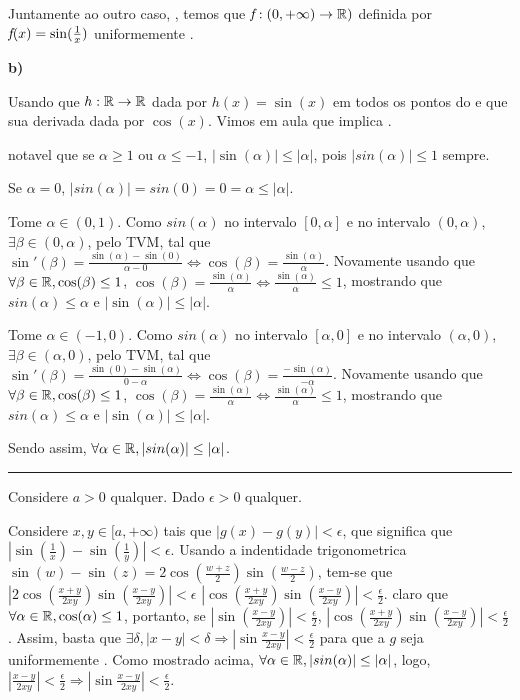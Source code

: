 Juntamente ao outro caso, \entao, temos que $\mkern-2mu f\mkern-3mu :(0,+\infty)\rightarrow\mathbb{R})$ definida por \mbox{$\mkern-2mu f\mkern-3mu (x) = \sin (\frac{1}{x})$} \nao \eh uniformemente \continua.

\textbf{b)}

Usando que $h:\mathbb{R}\rightarrow\mathbb{R}$ dada por $h(x) = \sin(x)$ \eh \diferenciavel em todos os pontos do \dominio e que sua derivada \eh dada por $\cos(x)$. Vimos em aula que \diferenciavel implica \continua.

\Eh notavel que se $\alpha\ge 1$ ou $\alpha \le -1$, \entao $|\sin(\alpha)| \le |\alpha|$, pois $|sin(\alpha)| \le 1$ sempre.

Se $\alpha = 0$, $|sin(\alpha)| = sin(0) = 0 = \alpha \le |\alpha|$.

Tome \entao $\alpha \in (0,1)$. Como $sin(\alpha)$ \eh \continua no intervalo $[0,\alpha]$ e \diferenciavel no intervalo $(0,\alpha)$, \entao $\exists \beta \in (0, \alpha)$, pelo TVM, tal que \mbox{$\sin'(\beta) = \frac{\sin(\alpha) - \sin(0)}{\alpha - 0} \iff \cos(\beta) = \frac{\sin(\alpha)}{\alpha}$}. Novamente usando que $\forall \beta \in \mathbb{R}, \cos(\beta) \leq 1$, $\cos(\beta) = \frac{\sin(\alpha)}{\alpha} \iff  \frac{\sin(\alpha)}{\alpha} \le 1$, mostrando que $sin(\alpha) \le \alpha$ e $|\sin(\alpha)| \le |\alpha|$.

Tome \entao $\alpha \in (-1,0)$. Como $sin(\alpha)$ \eh \continua no intervalo $[\alpha,0]$ e \diferenciavel no intervalo $(\alpha,0)$, \entao $\exists \beta \in (\alpha, 0)$, pelo TVM, tal que \mbox{$\sin'(\beta) = \frac{\sin(0) - \sin(\alpha)}{0-\alpha} \iff \cos(\beta) = \frac{-\sin(\alpha)}{-\alpha}$}. Novamente usando que $\forall \beta \in \mathbb{R}, \cos(\beta) \leq 1$, $\cos(\beta) = \frac{\sin(\alpha)}{\alpha} \iff  \frac{\sin(\alpha)}{\alpha} \le 1$, mostrando que $sin(\alpha) \le \alpha$ e $|\sin(\alpha)| \le |\alpha|$.

Sendo assim, $\forall \alpha \in \mathbb{R}, |sin(\alpha)| \le |\alpha|$.
\\
\hrule
\vspace{1cm}

Considere $a > 0$ qualquer. Dado $\epsilon > 0$ qualquer.

Considere $x,y\in [a,+\infty)$ tais que
$
|g(x) - g(y)| < \epsilon
$, que significa que \mbox{
$
|\sin(\frac{1}{x}) - \sin(\frac{1}{y})| < \epsilon
$}. Usando a indentidade trigonometrica $\sin(w) - \sin(z) = 2\cos(\frac{w+z}{2})\sin(\frac{w-z}{2})$, tem-se que
$
|2\cos(\frac{x+y}{2xy})\sin(\frac{x-y}{2xy})| < \epsilon$ \entao 
$|\cos(\frac{x+y}{2xy})\sin(\frac{x-y}{2xy})| < \frac{\epsilon}{2}
$. \Eh claro que \mbox{$\forall \alpha \in \mathbb{R}, \cos(\alpha) \leq 1$}, portanto, se $|\sin(\frac{x-y}{2xy})| < \frac{\epsilon}{2}$, \entao $|\cos(\frac{x+y}{2xy})\sin(\frac{x-y}{2xy})| < \frac{\epsilon}{2}$. Assim, basta que $\exists \delta, |x-y| < \delta \Rightarrow |\sin\frac{x-y}{2xy}| < \frac{\epsilon}{2}$ para que a \funcao $g$ seja uniformemente \mbox{\continua.} Como mostrado acima, \mbox{$\forall \alpha \in \mathbb{R}, |sin(\alpha)| \le |\alpha|$}, logo, $|\frac{x-y}{2xy}| < \frac{\epsilon}{2} \Rightarrow |\sin\frac{x-y}{2xy}| < \frac{\epsilon}{2}$. 

